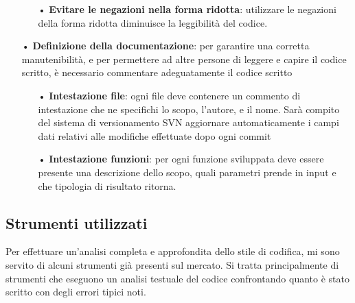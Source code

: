 \begin{itemize}
\begin{itemize}
\item[•] \textbf{Evitare le negazioni nella forma ridotta}: utilizzare le negazioni della forma ridotta diminuisce la leggibilità del codice.
\end{itemize}

\item[•] \textbf{Definizione della documentazione}: per garantire una corretta manutenibilità, e per permettere ad altre persone di leggere e capire il codice scritto, è necessario commentare adeguatamente il codice scritto

\begin{itemize}
\item[•] \textbf{Intestazione file}: ogni file deve contenere un commento di intestazione che ne specifichi lo scopo, l'autore, e il nome. Sarà compito del sistema di versionamento SVN aggiornare automaticamente i campi dati relativi alle modifiche effettuate dopo ogni commit

\item[•] \textbf{Intestazione funzioni}: per ogni funzione sviluppata deve essere presente una descrizione dello scopo, quali parametri prende in input e che tipologia di risultato ritorna. 
\end{itemize}
\end{itemize}

\subsection{Strumenti utilizzati}
Per effettuare un'analisi completa e approfondita dello stile di codifica, mi sono servito di alcuni strumenti  già presenti sul mercato. Si tratta principalmente di strumenti che eseguono un analisi testuale del codice confrontando quanto è stato scritto con degli errori tipici noti.

